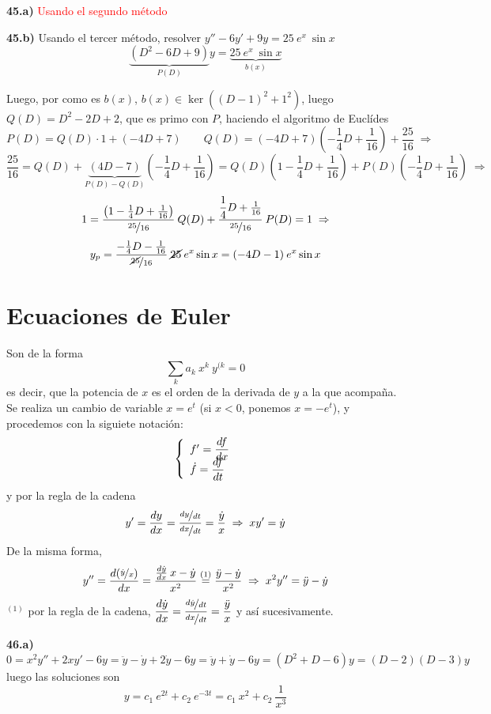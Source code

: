 \begin{ejer}
    \textbf{45.a)} \textcolor{red}{Usando el segundo método}
\end{ejer}
\begin{ejer}
    \textbf{45.b)} Usando el tercer método, resolver $y''-6y'+9y=25 \: e^x\: \sin x$
    $$\underbrace{(D^2-6D+9)}_{P(D)}y=\underbrace{25 \: e^x\: \sin x}_{b(x)}  $$
\end{ejer}
\begin{sol}
    Luego, por como es $b(x)$, $b(x) \in \ker ((D-1)^2+1^2)$, luego $Q(D)=D^2-2D+2$, que es primo con $P$, haciendo el algoritmo de Euclídes
    $$P(D)=Q(D) \cdot 1 + (-4D+7) \qquad Q(D)=(-4D+7)\left( -\dfrac{1}{4}D+\dfrac{1}{16}\right)+\dfrac{25}{16} \; \Rightarrow $$
    $$\dfrac{25}{16}=Q(D)+\underbrace{(4D-7)}_{P(D)-Q(D)}\left( -\dfrac{1}{4}D+\dfrac{1}{16}\right)=Q(D)\left(1-\dfrac{1}{4}D+\dfrac{1}{16} \right) + P(D)\left( -\dfrac{1}{4}D+\dfrac{1}{16}\right) \;\Rightarrow$$
    $$1=\dfrac{\left(1-\frac{1}{4}D+\frac{1}{16} \right)}{\nicefrac{25}{16}} \: Q(D)+\dfrac{\dfrac{1}{4}D+\frac{1}{16}}{\nicefrac{25}{16}} \: P(D)=1 \; \Rightarrow$$
    $$y_p=\dfrac{-\frac{1}{4}D-\frac{1}{16}}{\nicefrac{\cancel{25}}{16}} \: \cancel{25} \: e^x \sin x=(-4D-1) \: e^x \sin x$$
\end{sol}
\section{Ecuaciones de Euler}
Son de la forma
$$\sum_k a_k\:  x^k \: y^{(k}=0$$
es decir, que la potencia de $x$ es el orden de la derivada de $y$ a la que acompaña. Se realiza un cambio de variable $x=e^t$ (si $x<0$, ponemos $x=-e^t$), y procedemos con la siguiete notación:
$$\left\{ \begin{array}{l}
     f'=\dfrac{df}{dx}  \\
     \vspace{-5mm} \\
     \dot{f}=\dfrac{df}{dt} 
\end{array}\right.$$
y por la regla de la cadena
$$y'=\dfrac{dy}{dx}=\dfrac{\nicefrac{dy}{dt}}{\nicefrac{dx}{dt}}=\dfrac{\dot{y}}{x} \; \Rightarrow \; xy'=\dot{y}$$
De la misma forma, 
$$y''=\dfrac{d(\nicefrac{\dot{y}}{x})}{dx}=\dfrac{\frac{d\dot{y}}{dx} \: x - \dot{y}}{x^2}\overset{(1)}{=}\dfrac{\ddot{y}-\dot{y}}{x^2} \; \Rightarrow \; x^2 y''=\ddot{y}-\dot{y}$$
$^{(1)}$ por la regla de la cadena, $\dfrac{d\dot{y}}{dx}=\dfrac{\nicefrac{d\dot{y}}{dt}}{\nicefrac{dx}{dt}}=\dfrac{\ddot{y}}{x}$
y así sucesivamente.
\begin{ejer}
    \textbf{46.a)} $$0=x^2y''+2xy'-6y=\ddot{y}-\dot{y}+2\dot{y}-6y=\ddot{y}+\dot{y}-6y=(D^2+D-6)y=(D-2)(D-3)y$$
    luego las soluciones son
    $$y=c_1 \:  e^{2t} + c_2 \: e^{-3t}=c_1 \: x^2 + c_2 \: \dfrac{1}{x^3}$$
\end{ejer}
